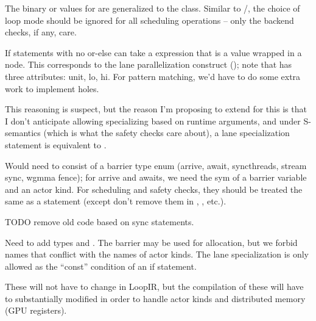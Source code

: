 \filbreak
{}

 The binary  or  values for  are generalized to the  class.
Similar to /, the choice of loop mode should be ignored for all scheduling operations -- only the backend checks, if any, care.

\filbreak
{} If statements with no or-else can take a  expression that is a  value wrapped in a  node.
This corresponds to the lane parallelization construct (); note that  has three attributes: unit, lo, hi.
For pattern matching, we'd have to do some extra work to implement holes.

\filbreak
This reasoning is suspect, but the reason I'm proposing to extend  for this is that I don't anticipate allowing specializing based on runtime arguments, and under S-semantics (which is what the safety checks care about), a lane specialization statement is equivalent to .

\filbreak
{} Would need to consist of a barrier type enum (arrive, await, syncthreads, stream sync, wgmma fence); for arrive and awaits, we need the sym of a barrier variable and an actor kind.
For scheduling and safety checks, they should be treated the same as a  statement (except don't remove them in , , etc.).

TODO remove old code based on  sync statements.

\filbreak
{} Need to add types  and .
The barrier may be used for allocation, but we forbid names that conflict with the names of actor kinds.
The lane specialization is only allowed as the ``const'' condition of an if statement.

\filbreak
{} These will not have to change in LoopIR, but the compilation of these will have to substantially modified in order to handle actor kinds and distributed memory (GPU registers).

\filbreak
{}

